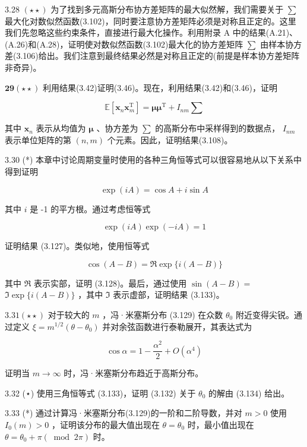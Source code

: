 \documentclass[10pt]{report}
\begin{document}
3.28 \(\left( {\star  \star  }\right)\) 为了找到多元高斯分布协方差矩阵的最大似然解，我们需要关于 \(\mathbf{\sum }\) 最大化对数似然函数(3.102)，同时要注意协方差矩阵必须是对称且正定的。这里我们先忽略这些约束条件，直接进行最大化操作。利用附录 A 中的结果(A.21)、(A.26)和(A.28)，证明使对数似然函数(3.102)最大化的协方差矩阵 \(\mathbf{\sum }\) 由样本协方差(3.106)给出。我们注意到最终结果必然是对称且正定的(前提是样本协方差矩阵非奇异)。

\(\mathbf{{29}}\left( {\star  \star  }\right)\) 利用结果(3.42)证明(3.46)。现在，利用结果(3.42)和(3.46)，证明

\[
\mathbb{E}\left\lbrack  {{\mathbf{x}}_{n}{\mathbf{x}}_{m}^{\mathrm{T}}}\right\rbrack   = \mathbf{\mu }{\mathbf{\mu }}^{\mathrm{T}} + {I}_{nm}\mathbf{\sum } \tag{3.213}
\]

其中 \({\mathbf{x}}_{n}\) 表示从均值为 \(\mathbf{\mu }\) 、协方差为 \(\mathbf{\sum }\) 的高斯分布中采样得到的数据点， \({I}_{nm}\) 表示单位矩阵的第 \(\left( {n,m}\right)\) 个元素。因此，证明结果(3.108)。

3.30 (*) 本章中讨论周期变量时使用的各种三角恒等式可以很容易地从以下关系中得到证明

\[
\exp \left( {iA}\right)  = \cos A + i\sin A \tag{3.214}
\]

其中 \(i\) 是 -1 的平方根。通过考虑恒等式

\[
\exp \left( {iA}\right) \exp \left( {-{iA}}\right)  = 1 \tag{3.215}
\]

证明结果 (3.127)。类似地，使用恒等式

\[
\cos \left( {A - B}\right)  = \Re \exp \{ i\left( {A - B}\right) \}  \tag{3.216}
\]

其中 \(\Re\) 表示实部，证明 (3.128)。最后，通过使用 \(\sin \left( {A - B}\right)  =\)  \(\Im \exp \{ i\left( {A - B}\right) \}\) ，其中 \(\Im\) 表示虚部，证明结果 (3.133)。

\({3.31}\left( {\star  \star  }\right)\) 对于较大的 \(m\) ，冯·米塞斯分布 (3.129) 在众数 \({\theta }_{0}\) 附近变得尖锐。通过定义 \(\xi  = {m}^{1/2}\left( {\theta  - {\theta }_{0}}\right)\) 并对余弦函数进行泰勒展开，其表达式为

\[
\cos \alpha  = 1 - \frac{{\alpha }^{2}}{2} + O\left( {\alpha }^{4}\right)  \tag{3.217}
\]

证明当 \(m \rightarrow  \infty\) 时，冯·米塞斯分布趋近于高斯分布。

3.32 (⋆) 使用三角恒等式 (3.133)，证明 (3.132) 关于 \({\theta }_{0}\) 的解由 (3.134) 给出。

3.33 (*) 通过计算冯·米塞斯分布(3.129)的一阶和二阶导数，并对 \(m > 0\) 使用 \({I}_{0}\left( m\right)  > 0\) ，证明该分布的最大值出现在 \(\theta  = {\theta }_{0}\) 时，最小值出现在 \(\theta  = {\theta }_{0} + \pi \left( {{\;\operatorname{mod}\;2}\pi }\right)\) 时。
\end{document}
